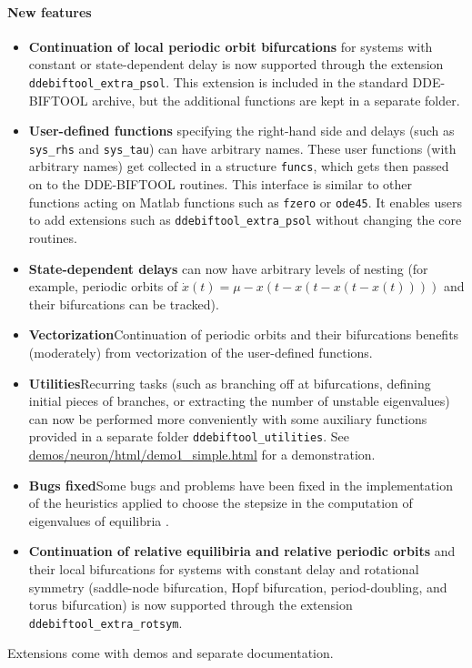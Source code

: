 \documentclass[10pt]{scrartcl}
\newcommand{\DDEBIFCODE}{\textsc{DDE-BIFTOOL}}
\newcommand{\blist}[1]{\mbox{\lstinline!#1!}}
\begin{document}
\paragraph{New features}
\begin{itemize}
\item\label{int:pocont} \textbf{\textsf{Continuation of local periodic orbit
    bifurcations}} for systems with constant or state-dependent delay
  is now supported through the extension \texttt{ddebiftool\_extra\_psol}. This
  extension is included in the standard \DDEBIFCODE{} archive, but the
  additional functions are kept in a separate folder.
\item \textbf{\textsf{User-defined functions}} specifying the right-hand side
  and delays (such as \blist{sys_rhs} and \blist{sys_tau}) can have
  arbitrary names.  These user functions (with arbitrary names) get
  collected in a structure \blist{funcs}, which gets then passed on to
  the \DDEBIFCODE{} routines. This interface is similar to other
  functions acting on Matlab functions such as \blist{fzero} or
  \blist{ode45}. It enables users to add extensions such as
  \texttt{ddebiftool\_extra\_psol} without changing the core routines.
\item \textbf{\textsf{State-dependent delays}} can now have arbitrary levels of
  nesting (for example, periodic orbits of $\dot
  x(t)=\mu-x(t-x(t-x(t-x(t))))$ and their bifurcations can be
  tracked).
\item \textbf{\textsf{Vectorization}}\quad Continuation of periodic orbits
  and their bifurcations benefits (moderately) from
  vectorization of the user-defined functions.
\item \textbf{\textsf{Utilities}}\quad Recurring tasks (such as branching
  off at bifurcations, defining initial pieces of branches, or
  extracting the number of unstable eigenvalues) can now be performed
  more conveniently with some auxiliary functions provided in a
  separate folder \texttt{ddebiftool\_utilities}. See
  \url{demos/neuron/html/demo1_simple.html} for a demonstration.
\item \textbf{\textsf{Bugs fixed}}\quad Some bugs and problems have been
  fixed in the implementation of the heuristics applied to choose the
  stepsize in the computation of eigenvalues of equilibria
  \cite{VLR08}.
\item \textbf{\textsf{Continuation of relative equilibiria and
      relative periodic orbits}} and their local bifurcations for
  systems with constant delay and rotational symmetry (saddle-node
  bifurcation, Hopf bifurcation, period-doubling, and torus
  bifurcation) is now supported through the extension
  \texttt{ddebiftool\_extra\_rotsym}.
\end{itemize}
Extensions come with demos and separate documentation.
\end{document}
